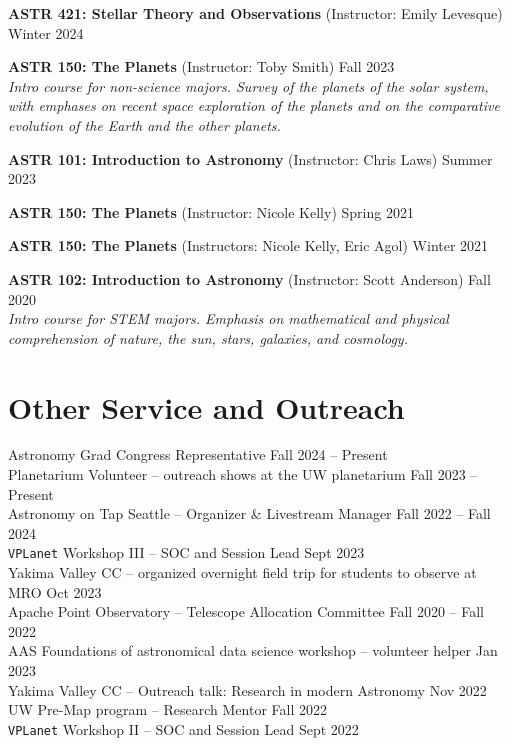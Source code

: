 \documentclass[a4,11pt]{article}
\begin{document}
\textbf{ASTR 421: Stellar Theory and Observations} (Instructor: Emily Levesque) \hfill Winter 2024 \\
\vspace{.2cm}

\textbf{ASTR 150: The Planets} (Instructor: Toby Smith) \hfill Fall 2023  \\
\textsl{Intro course for non-science majors. Survey of the planets of the solar system, with emphases on recent space exploration of the planets and on the comparative evolution of the Earth and the other planets.} \vspace{.2cm}

\textbf{ASTR 101: Introduction to Astronomy} (Instructor: Chris Laws) \hfill Summer 2023  \\
\vspace{.2cm}

\textbf{ASTR 150: The Planets} (Instructor: Nicole Kelly) \hfill Spring 2021  \\
\vspace{.2cm}

\textbf{ASTR 150: The Planets} (Instructors: Nicole Kelly, Eric Agol) \hfill Winter 2021  \\
\vspace{.2cm}

\textbf{ASTR 102: Introduction to Astronomy} (Instructor: Scott Anderson) \hfill Fall 2020 \\
\textsl{Intro course for STEM majors. Emphasis on mathematical and physical comprehension of nature, the sun, stars, galaxies, and cosmology.}


\section{Other Service and Outreach}

Astronomy Grad Congress Representative \hfill Fall 2024 -- Present \\
Planetarium Volunteer -- outreach shows at the UW planetarium \hfill Fall 2023 -- Present \\
Astronomy on Tap Seattle -- Organizer \& Livestream Manager \hfill Fall 2022 -- Fall 2024 \\
\texttt{VPLanet} Workshop III -- SOC and Session Lead \hfill Sept 2023 \\
Yakima Valley CC -- organized overnight field trip for students to observe at MRO \hfill Oct 2023 \\
Apache Point Observatory -- Telescope Allocation Committee \hfill Fall 2020 -- Fall 2022 \\
AAS Foundations of astronomical data science workshop -- volunteer helper \hfill Jan 2023 \\
Yakima Valley CC -- Outreach talk: Research in modern Astronomy \hfill Nov 2022 \\
UW Pre-Map program -- Research Mentor \hfill Fall 2022 \\
\texttt{VPLanet} Workshop II -- SOC and Session Lead \hfill Sept 2022 
\end{document}
